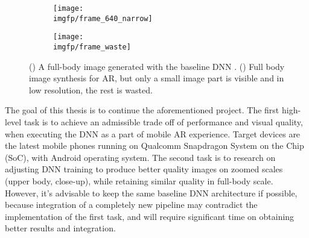 \begin{figure}[h!]
	\fboxrule=2pt
	\centering
	\begin{subfigure}[b]{0.4\textwidth}
		\centering
		\texttt{[image: \\imgfp/frame\_640\_narrow]}
		\caption{}
		\label{intro:fig:stylepeople_frame:640}
	\end{subfigure}
	\hfill
	\begin{subfigure}[b]{0.59\textwidth}
		\centering
		\texttt{[image: \\imgfp/frame\_waste]}
		\caption{}
		\label{intro:fig:stylepeople_frame:waste}
	\end{subfigure}

	\caption{(\protect{}) A full-body image generated with the baseline DNN \cite{dnn:stylepeople21}. (\protect{}) Full body image synthesis for AR, but only a small image part is visible and in low resolution, the rest is wasted.}
	\label{intro:fig:stylepeople_frame}
\end{figure}
 
The goal of this thesis is to continue the aforementioned project. The first high-level task is to achieve an admissible trade off of performance and visual quality, when executing the DNN as a part of mobile AR experience. Target devices are the latest mobile phones running on Qualcomm Snapdragon System on the Chip (SoC), with Android operating system. The second task is to research on adjusting DNN training to produce better quality images on zoomed scales (upper body, close-up), while retaining similar quality in full-body scale. However, it's advisable to keep the same baseline \cite{dnn:stylepeople21} DNN architecture if possible, because integration of a completely new pipeline may contradict the implementation of the first task, and will require significant time on obtaining better results and integration.
 
